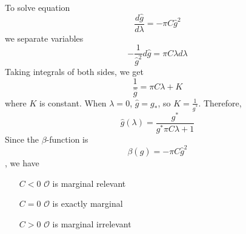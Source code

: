 To solve equation
\begin{equation}
	\frac{d\hat{g}}{d\lambda} = - \pi C \hat{g}^2
\end{equation}
we separate variables
\[
- \frac{1}{\hat{g}^2} d \hat{g} = \pi C \lambda d\lambda
\]
Taking integrals of both sides, we get
\begin{equation}
\frac{1}{\hat{g}} = \pi C\lambda +K
\end{equation}
where $K$ is constant. When $\lambda=0$, $\hat{g} = g_*$, so $K = \frac{1}{g^*}$. Therefore,
\[
\hat{g}(\lambda) = \frac{g^*}{g^* \pi C \lambda +1}
\]
Since the $\beta$-function is
\[ 
\beta(\hat{g}) = - \pi C \hat{g}^2
\]
, we have
\begin{itemize}
	\item[$C < 0$] $\mathcal{O}$ is marginal relevant
	\item[$C=0$] $\mathcal{O}$ is exactly marginal
	\item[$C > 0$] $\mathcal{O}$ is marginal irrelevant
\end{itemize}